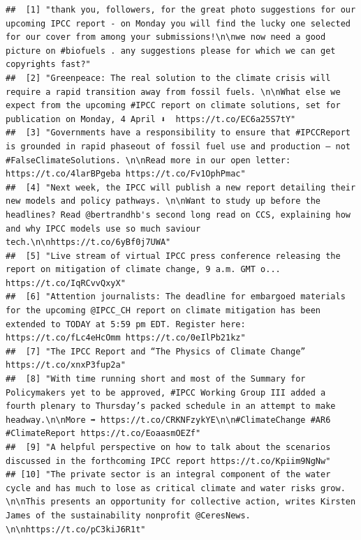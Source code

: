 \documentclass[
]{article}
\begin{document}
\begin{verbatim}
##  [1] "thank you, followers, for the great photo suggestions for our upcoming IPCC report - on Monday you will find the lucky one selected for our cover from among your submissions!\n\nwe now need a good picture on #biofuels . any suggestions please for which we can get copyrights fast?"        
##  [2] "Greenpeace: The real solution to the climate crisis will require a rapid transition away from fossil fuels. \n\nWhat else we expect from the upcoming #IPCC report on climate solutions, set for publication on Monday, 4 April ⬇️  https://t.co/EC6a25S7tY"                                      
##  [3] "Governments have a responsibility to ensure that #IPCCReport is grounded in rapid phaseout of fossil fuel use and production — not #FalseClimateSolutions. \n\nRead more in our open letter: https://t.co/4larBPgeba https://t.co/Fv1OphPmac"                                                    
##  [4] "Next week, the IPCC will publish a new report detailing their new models and policy pathways. \n\nWant to study up before the headlines? Read @bertrandhb's second long read on CCS, explaining how and why IPCC models use so much saviour tech.\n\nhttps://t.co/6yBf0j7UWA"                    
##  [5] "Live stream of virtual IPCC press conference releasing the report on mitigation of climate change, 9 a.m. GMT o... https://t.co/IqRCvvQxyX"                                                                                                                                                      
##  [6] "Attention journalists: The deadline for embargoed materials for the upcoming @IPCC_CH report on climate mitigation has been extended to TODAY at 5:59 pm EDT. Register here: https://t.co/fLc4eHcOmm https://t.co/0eIlPb21kz"                                                                    
##  [7] "The IPCC Report and “The Physics of Climate Change” https://t.co/xnxP3fup2a"                                                                                                                                                                                                                     
##  [8] "With time running short and most of the Summary for Policymakers yet to be approved, #IPCC Working Group III added a fourth plenary to Thursday’s packed schedule in an attempt to make headway.\n\nMore ➡️ https://t.co/CRKNFzykYE\n\n#ClimateChange #AR6 #ClimateReport https://t.co/EoaasmOEZf"
##  [9] "A helpful perspective on how to talk about the scenarios discussed in the forthcoming IPCC report https://t.co/Kpiim9NgNw"                                                                                                                                                                       
## [10] "The private sector is an integral component of the water cycle and has much to lose as critical climate and water risks grow. \n\nThis presents an opportunity for collective action, writes Kirsten James of the sustainability nonprofit @CeresNews.  \n\nhttps://t.co/pC3kiJ6R1t"
\end{verbatim}
\end{document}
